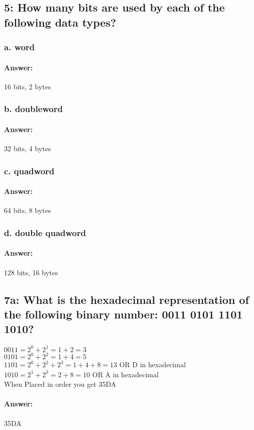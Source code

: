 \documentclass[12pt]{article}
\begin{document}
\subsection*{5: How many bits are used by each of the following data types?}
\subsubsection*{a. word}
\paragraph{Answer: } 16 bits, 2 bytes
\subsubsection*{b. doubleword}
\paragraph{Answer: } 32 bits, 4 bytes
\subsubsection*{c. quadword}
\paragraph{Answer: } 64 bits, 8 bytes
\subsubsection*{d. double quadword}
\paragraph{Answer: } 128 bits, 16 bytes

\subsection*{7a: What is the hexadecimal representation of the following binary number: 0011 0101 1101 1010?}
$0011 = 2^0 + 2^1 = 1 + 2 = 3$ \\ 
$0101 = 2^0 + 2^2 = 1 + 4 = 5$ \\
$1101 = 2^0 + 2^2 + 2^3 = 1 + 4 + 8 = 13$ OR D in hexadecimal \\ 
$1010 = 2^1 + 2^3 = 2 + 8 = 10$ OR A in hexadecimal \\
When Placed in order you get 35DA
\paragraph*{Answer: } 35DA
\end{document}

